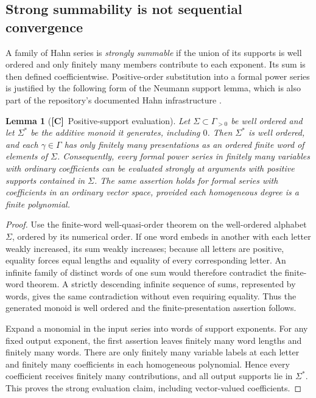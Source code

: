 \documentclass[11pt,oneside]{article}
\numberwithin{equation}{section}
\theoremstyle{plain}
\newtheorem{lemma}[lemma]{Lemma}
\theoremstyle{definition}
\theoremstyle{remark}
\newcommand{\TC}{\textcolor{TierC}{\textsf{\bfseries[C]}}}
\begin{document}
\subsection{Strong summability is not sequential convergence}\label{qgs:sec:strong}
A family of Hahn series is \emph{strongly summable} if the union of its supports is well ordered and only finitely many members contribute to each exponent. Its sum is then defined coefficientwise. Positive-order substitution into a formal power series is justified by the following form of the Neumann support lemma, which is also part of the repository's documented Hahn infrastructure \cite{repo,repoQuaternion}.

\begin{lemma}[\TC\ Positive-support evaluation]\label{qgs:obs:lem:support}
Let $\Sigma\subset\Gamma_{>0}$ be well ordered and let $\Sigma^*$ be the additive monoid it generates, including $0$. Then $\Sigma^*$ is well ordered, and each $\gamma\in\Gamma$ has only finitely many presentations as an ordered finite word of elements of $\Sigma$. Consequently, every formal power series in finitely many variables with ordinary coefficients can be evaluated strongly at arguments with positive supports contained in $\Sigma$. The same assertion holds for formal series with coefficients in an ordinary vector space, provided each homogeneous degree is a finite polynomial.
\end{lemma}
\begin{proof}
Use the finite-word well-quasi-order theorem on the well-ordered alphabet $\Sigma$, ordered by its numerical order. If one word embeds in another with each letter weakly increased, its sum weakly increases; because all letters are positive, equality forces equal lengths and equality of every corresponding letter. An infinite family of distinct words of one sum would therefore contradict the finite-word theorem. A strictly descending infinite sequence of sums, represented by words, gives the same contradiction without even requiring equality. Thus the generated monoid is well ordered and the finite-presentation assertion follows.

Expand a monomial in the input series into words of support exponents. For any fixed output exponent, the first assertion leaves finitely many word lengths and finitely many words. There are only finitely many variable labels at each letter and finitely many coefficients in each homogeneous polynomial. Hence every coefficient receives finitely many contributions, and all output supports lie in $\Sigma^*$. This proves the strong evaluation claim, including vector-valued coefficients.
\end{proof}
\end{document}
